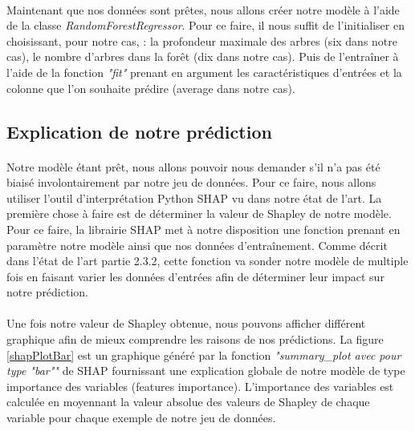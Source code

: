 \paragraph{}Maintenant que nos données sont prêtes, nous allons créer notre modèle à l'aide de la classe \textit{RandomForestRegressor}. Pour ce faire, il nous suffit de l'initialiser en choisissant, pour notre cas, : la profondeur maximale des arbres (six dans notre cas), le nombre d'arbres dans la forêt (dix dans notre cas). Puis de l'entraîner à l'aide de la fonction \textit{"fit"} prenant en argument les caractéristiques d'entrées et la colonne que l'on souhaite prédire (average dans notre cas).

\subsection{Explication de notre prédiction}
\paragraph{}Notre modèle étant prêt, nous allons pouvoir nous demander s'il n'a pas été biaisé involontairement par notre jeu de données. Pour ce faire, nous allons utiliser l'outil d'interprétation Python SHAP vu dans notre état de l'art. La première chose à faire est de déterminer la valeur de Shapley de notre modèle. Pour ce faire, la librairie SHAP met à notre disposition une fonction prenant en paramètre notre modèle ainsi que nos données d'entraînement. Comme décrit dans l'état de l'art partie 2.3.2, cette fonction va sonder notre modèle de multiple fois en faisant varier les données d'entrées afin de déterminer leur impact sur notre prédiction.

\paragraph{}Une fois notre valeur de Shapley obtenue, nous pouvons afficher différent graphique afin de mieux comprendre les raisons de nos prédictions. La figure \ref{shapPlotBar} est un graphique généré par la fonction \textit{"summary\_plot avec pour type "bar""} de SHAP fournissant une explication globale de notre modèle de type importance des variables (features importance). L’importance des variables est calculée en moyennant la valeur absolue des valeurs de Shapley de chaque variable pour chaque exemple de notre jeu de données.

